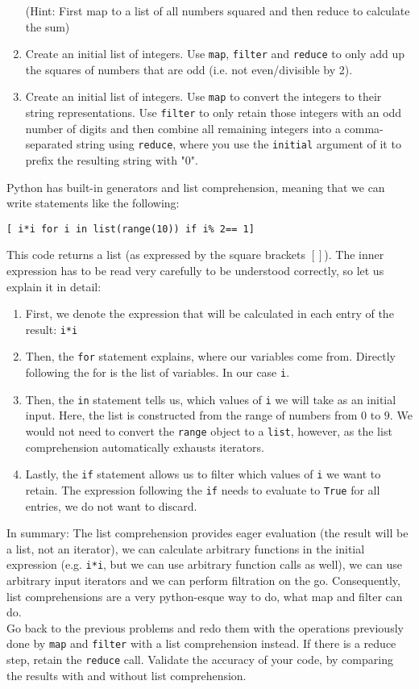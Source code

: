 \documentclass[]{erlangen-problemset}
\begin{document}
\begin{problem}[title={Working with advanced data processing functions}]
\begin{enumerate}
	(Hint: First map to a list of all numbers squared and then reduce to calculate the sum)
	\item Create an initial list of integers. 
	Use \texttt{map}, \texttt{filter} and \texttt{reduce} to only add up the squares of numbers that are odd (i.e. not even/divisible by 2). 
	\item Create an initial list of integers. 
	Use \texttt{map} to convert the integers to their string representations. 
	Use \texttt{filter} to only retain those integers with an odd number of digits and then combine all remaining integers into a comma-separated string using \texttt{reduce}, 
	where you use the \texttt{initial} argument of it to prefix the resulting string with "0".
\end{enumerate}
\Question Python has built-in generators and list comprehension, meaning that we can write statements like the following:
\begin{center}
	\texttt{[ i*i for i in list(range(10)) if i\% 2== 1]}
\end{center}
This code returns a list (as expressed by the square brackets $[]$). 
The inner expression has to be read very carefully to be understood correctly, so let us explain it in detail:
\begin{enumerate}
	\item First, we denote the expression that will be calculated in each entry of the result: \texttt{i*i}
	\item Then, the \texttt{for} statement explains, where our variables come from. 
	Directly following the for is the list of variables. 
	In our case \texttt{i}.
	\item Then, the \texttt{in} statement tells us, which values of \texttt{i} we will take as an initial input. 
	Here, the list is constructed from the range of numbers from $0$ to $9$. 
	We would not need to convert the \texttt{range} object to a \texttt{list}, however, as the list comprehension automatically exhausts iterators.
	\item Lastly, the \texttt{if} statement allows us to filter which values of \texttt{i} we want to retain. 
	The expression following the \texttt{if} needs to evaluate to \texttt{True} for all entries, we do not want to discard. 
\end{enumerate}
In summary: The list comprehension provides eager evaluation (the result will be a list, not an iterator), we can calculate arbitrary functions in the initial expression (e.g. \texttt{i*i}, but we can use arbitrary function calls as well), we can use arbitrary input iterators and we can perform filtration on the go. 
Consequently, list comprehensions are a very python-esque way to do, what map and filter can do. \\
Go back to the previous problems and redo them with the operations previously done by \texttt{map} and \texttt{filter} with a list comprehension instead. 
If there is a reduce step, retain the \texttt{reduce} call. 
Validate the accuracy of your code, by comparing the results with and without list comprehension.
\end{problem}
\end{document}
